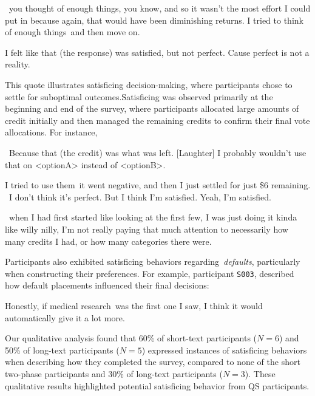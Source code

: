 \begin{displayquote}
    ~\bracketellipsis you thought of enough things, you know, and so it wasn't the most effort I could put in because again, that would have been diminishing returns. I tried to think of enough things~\bracketellipsis and then move on.~\bracketellipsis 
    
    I felt like that (the response) was satisfied, but not perfect. Cause perfect is not a reality. \hfill{}
\end{displayquote}

This quote illustrates satisficing decision-making, where participants chose to settle for suboptimal outcomes.Satisficing was observed primarily at the beginning and end of the survey, where participants allocated large amounts of credit initially and then managed the remaining credits to confirm their final vote allocations. For instance, 

\begin{displayquote}
    ~\bracketellipsis Because that (the credit) was what was left. [Laughter] I probably wouldn't use that on <optionA> instead of <optionB>.~\bracketellipsis \hfill{}

    I tried to use them~\bracketellipsis it went negative, and then I just settled for just \$6 remaining. ~\bracketellipsis I don't think it's perfect. But I think I'm satisfied. Yeah, I'm satisfied.  \hfill{}

    ~\bracketellipsis when I had first started like looking at the first few, I was just doing it kinda like willy nilly, I'm not really paying that much attention to necessarily how many credits I had, or how many categories there were. \hfill{}
\end{displayquote}

Participants also exhibited satisficing behaviors regarding~\textit{defaults}, particularly when constructing their preferences. For example, participant \texttt{S003}, described how default placements influenced their final decisions:

\begin{displayquote}
    Honestly, if medical research~\bracketellipsis was the first one I saw, I think it would automatically give it a lot more. \hfill{}
\end{displayquote}

Our qualitative analysis found that 60\% of short-text participants ($N=6$) and 50\% of long-text participants ($N=5$) expressed instances of satisficing behaviors when describing how they completed the survey, compared to none of the short two-phase participants and 30\% of long-text participants ($N=3$). These qualitative results highlighted potential satisficing behavior from QS participants.














